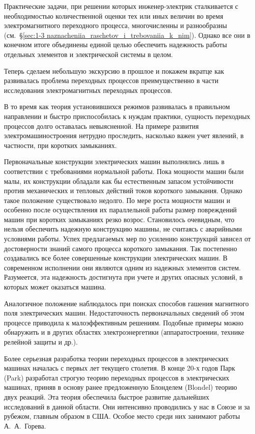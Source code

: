 Практические задачи, при решении которых инженер-электрик сталкивается с необходимостью количественной оценки тех или иных величин во время электромагнитного переходного процесса, многочисленны и разнообразны (см.~§\ref{sec:1-3 naznacheniia_raschetov_i_trebovaniia_k_nim}). Однако все они в конечном итоге объединены единой целью обеспечить надежность работы отдельных элементов и электрической системы в целом.

Теперь сделаем небольшую экскурсию в прошлое и покажем вкратце как развивалась проблема переходных процессов преимущественно в части исследования электромагнитных переходных процессов.

В то время как теория установившихся режимов развивалась в правильном направлении и быстро приспособилась к нуждам практики, сущность переходных процессов долго оставалась невыясненной. На примере развития электромашиностроения нетрудно проследить, насколько важен учет явлений, в частности, при коротких замыканиях.

Первоначальные конструкции электрических машин выполнялись лишь в соответствии с требованиями нормальной работы. Пока мощности машин были малы, их конструкции обладали как бы естественным запасом устойчивости против механических и тепловых действий токов короткого замыкания. Однако такое положение существовало недолго. По мере роста мощности машин и особенно после осуществления их параллельной работы размер повреждений машин при коротких замыканиях резко возрос. Становилось очевидным, что нельзя обеспечить надежную конструкцию машины, не считаясь с аварийными условиями работы. Успех предлагаемых мер по усилению конструкций зависел от достоверности знаний самого процесса короткого замыкания. Так постепенно создавались все более совершенные конструкции электрических машин. В современном исполнении они являются одним из надежных элементов систем. Разумеется, эта надежность достигнута при учете и других опасных условий, в которых может оказаться машина.

Аналогичное положение наблюдалось при поисках способов гашения магнитного поля электрических машин. Недостаточность первоначальных сведений об этом процессе приводила к малоэффективным решениям. Подобные примеры можно обнаружить и в других областях электроэнергетики (аппаратостроении, технике релейной защиты и др.).

Более серьезная разработка теории переходных процессов в электрических машинах началась с первых лет текущего столетия. В конце 20-х годов Парк (Park) разработал строгую теорию переходных процессов в электрических машинах, приняв в основу ранее предложенную Блонделем (Blondel) теорию двух реакций. Эта теория обеспечила быстрое развитие дальнейших исследований в данной области. Они интенсивно проводились у нас в Союзе и за рубежом, главным образом в США. Особое место среди них занимают работы А.~А.~Горева.

